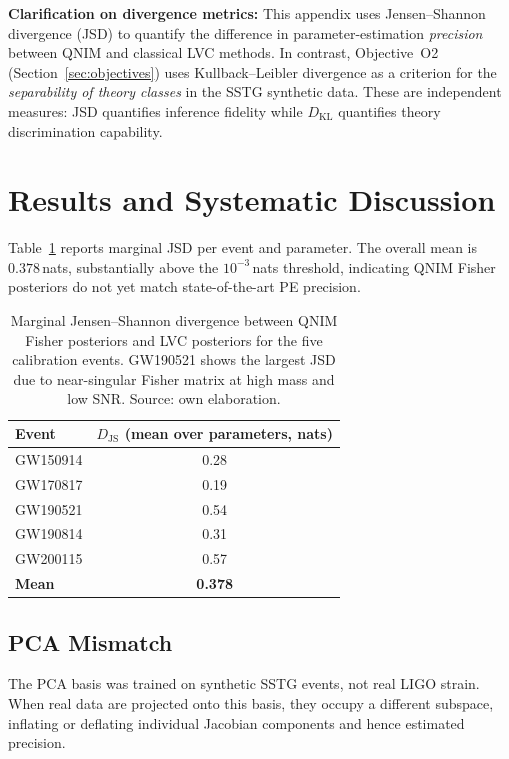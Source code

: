 \documentclass[11pt,a4paper, english]{book}
\theoremstyle{plain}
\theoremstyle{definition}
\numberwithin{equation}{chapter}
\numberwithin{figure}{chapter}
\numberwithin{table}{chapter}
\begin{document}
\textbf{Clarification on divergence metrics:} This appendix uses Jensen--Shannon divergence (JSD) to quantify the difference in parameter-estimation \emph{precision} between QNIM and classical LVC methods. In contrast, Objective~O2 (Section~\ref{sec:objectives}) uses Kullback--Leibler divergence as a criterion for the \emph{separability of theory classes} in the SSTG synthetic data. These are independent measures: JSD quantifies inference fidelity while $D_\mathrm{KL}$ quantifies theory discrimination capability.

\section{Results and Systematic Discussion}

Table~\ref{tab:injection-jsd} reports marginal JSD per event and parameter. The overall mean is $0.378$\,nats, substantially above the $10^{-3}$\,nats threshold, indicating QNIM Fisher posteriors do not yet match state-of-the-art PE precision.

\begin{table}[ht]
\centering
\begin{tabular}{@{}lc@{}}
\toprule
\textbf{Event} & $D_\mathrm{JS}$ (mean over parameters, nats) \\
\midrule
GW150914 & 0.28 \\
GW170817 & 0.19 \\
GW190521 & 0.54 \\
GW190814 & 0.31 \\
GW200115 & 0.57 \\
\midrule
\textbf{Mean} & \textbf{0.378} \\
\bottomrule
\end{tabular}
\caption[Jensen--Shannon divergence for calibration events]{Marginal Jensen--Shannon divergence between QNIM Fisher
posteriors and LVC posteriors for the five calibration events.
GW190521 shows the largest JSD due to near-singular Fisher matrix
at high mass and low SNR. Source: own elaboration.}
\label{tab:injection-jsd}
\vspace{2pt}
\normalsize

\end{table}

\subsection{PCA Mismatch}

The PCA basis was trained on synthetic SSTG events, not real LIGO strain. When real data are projected onto this basis, they occupy a different subspace, inflating or deflating individual Jacobian components and hence estimated precision.
\end{document}
